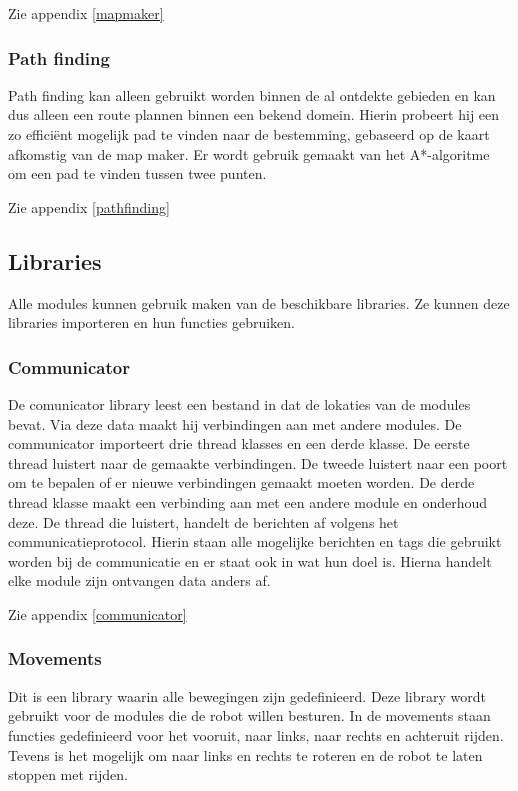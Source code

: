 \documentclass[a4paper,10pt]{article}
\begin{document}
Zie appendix \ref{mapmaker}

\subsubsection{Path finding}
Path finding kan alleen gebruikt worden binnen de al ontdekte gebieden en kan dus alleen een route plannen binnen een bekend domein. Hierin probeert hij een zo effici\"{e}nt mogelijk pad te vinden naar de bestemming, gebaseerd op de kaart afkomstig van de map maker. Er wordt gebruik gemaakt van het A*-algoritme om een pad te vinden tussen twee punten.

Zie appendix \ref{pathfinding}

\subsection{Libraries}
Alle modules kunnen gebruik maken van de beschikbare libraries. Ze kunnen deze libraries importeren en hun functies gebruiken.

\subsubsection{Communicator}
De comunicator library leest een bestand in dat de lokaties van de modules bevat. Via deze data maakt hij verbindingen aan met andere modules. De communicator importeert drie thread klasses en een derde klasse. De eerste thread luistert naar de gemaakte verbindingen. De tweede luistert naar een poort om te bepalen of er nieuwe verbindingen gemaakt moeten worden. De derde thread klasse maakt een verbinding aan met een andere module en onderhoud deze. De thread die luistert, handelt de berichten af volgens het communicatieprotocol. Hierin staan alle mogelijke berichten en tags die gebruikt worden bij de communicatie en er staat ook in wat hun doel is. Hierna handelt elke module zijn ontvangen data anders af.

Zie appendix \ref{communicator}

\subsubsection{Movements}
Dit is een library waarin alle bewegingen zijn gedefinieerd. Deze library wordt gebruikt voor de modules die de robot willen besturen. In de movements staan functies gedefinieerd voor het vooruit, naar links, naar rechts en achteruit rijden. Tevens is het mogelijk om naar links en rechts te roteren en de robot te laten stoppen met rijden.
\end{document}
